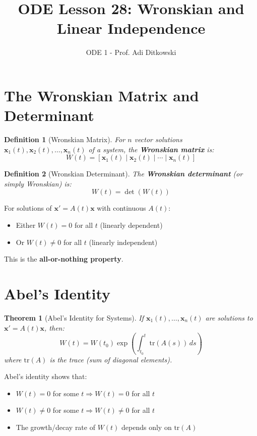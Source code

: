 \documentclass[12pt]{article}
\title{ODE Lesson 28: Wronskian and Linear Independence}
\author{ODE 1 - Prof. Adi Ditkowski}
\date{}
\newtheorem{definition}{Definition}
\newtheorem{theorem}{Theorem}
\begin{document}
\maketitle

\section{The Wronskian Matrix and Determinant}

\begin{definition}[Wronskian Matrix]
For $n$ vector solutions $\mathbf{x}_{1}(t), \mathbf{x}_{2}(t), \ldots, \mathbf{x}_{n}(t)$ of a system, the \textbf{Wronskian matrix} is:
$$W(t) = [\mathbf{x}_{1}(t) \mid \mathbf{x}_{2}(t) \mid \cdots \mid \mathbf{x}_{n}(t)]$$
\end{definition}

\begin{definition}[Wronskian Determinant]
The \textbf{Wronskian determinant} (or simply Wronskian) is:
$$W(t) = \det(W(t))$$
\end{definition}

\begin{keypoint}
For solutions of $\mathbf{x}' = A(t)\mathbf{x}$ with continuous $A(t)$:
\begin{itemize}
\item Either $W(t) = 0$ for all $t$ (linearly dependent)
\item Or $W(t) \neq 0$ for all $t$ (linearly independent)
\end{itemize}
This is the \textbf{all-or-nothing property}.
\end{keypoint}

\section{Abel's Identity}

\begin{theorem}[Abel's Identity for Systems]
If $\mathbf{x}_{1}(t), \ldots, \mathbf{x}_{n}(t)$ are solutions to $\mathbf{x}' = A(t)\mathbf{x}$, then:
$$W(t) = W(t_{0}) \exp\left(\int_{t_{0}}^{t} \text{tr}(A(s))\,ds\right)$$
where $\text{tr}(A)$ is the trace (sum of diagonal elements).
\end{theorem}

\begin{insight}
Abel's identity shows that:
\begin{itemize}
\item $W(t) = 0$ for some $t \Rightarrow W(t) = 0$ for all $t$
\item $W(t) \neq 0$ for some $t \Rightarrow W(t) \neq 0$ for all $t$
\item The growth/decay rate of $W(t)$ depends only on $\text{tr}(A)$
\end{itemize}
\end{insight}
\end{document}
